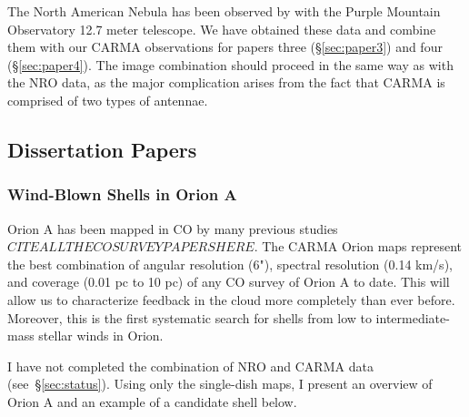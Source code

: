 The North American Nebula has been observed by \citet{Zhang14} with the Purple Mountain Observatory 12.7 meter telescope. We have obtained these data and combine them with our CARMA observations for papers three (\S\ref{sec:paper3}) and four (\S\ref{sec:paper4}). The image combination should proceed in the same way as with the NRO data, as the major complication arises from the fact that CARMA is comprised of two types of antennae.

    
    
    \subsection{Dissertation Papers}\label{sec:papers}
        \subsubsection{Wind-Blown Shells in Orion A}\label{sec:paper1}
Orion A has been mapped in CO by many previous studies$CITE ALL THE CO SURVEY PAPERS HERE$. The CARMA Orion maps represent the best combination of angular resolution (6"), spectral resolution (0.14 km/s), and coverage (0.01 pc to 10 pc) of any CO survey of Orion A to date. This will allow us to characterize feedback in the cloud more completely than ever before. Moreover, this is the first systematic search for shells from low to intermediate-mass stellar winds in Orion.
        
I have not completed the combination of NRO and CARMA data (see~\S\ref{sec:status}).  Using only the single-dish maps, I present an overview of Orion A and an example of a candidate shell below.
    
  